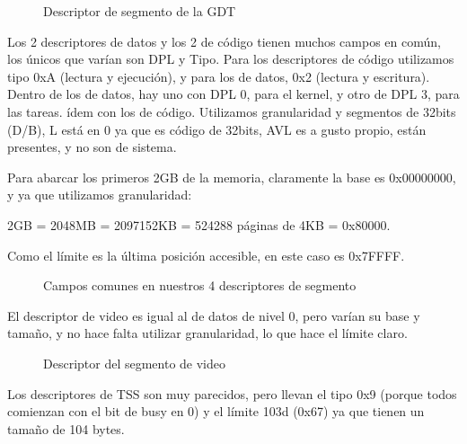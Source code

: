 \documentclass[10pt, a4paper]{article}
\begin{document}
		\begin{figure}[H]
	  		\centering
			\caption{Descriptor de segmento de la GDT}
			\label{fig:descriptorGDT}
		\end{figure}

Los 2 descriptores de datos y los 2 de código tienen muchos campos en común, los únicos que varían son DPL y Tipo. Para los descriptores de código utilizamos tipo 0xA (lectura y ejecución), y para los de datos, 0x2 (lectura y escritura). Dentro de los de datos, hay uno con DPL 0, para el kernel, y otro de DPL 3, para las tareas. ídem con los de código.
Utilizamos granularidad y segmentos de 32bits (D/B), L está en 0 ya que es código de 32bits, AVL es a gusto propio, están presentes, y no son de sistema.

Para abarcar los primeros 2GB de la memoria, claramente la base es 0x00000000, y ya que utilizamos granularidad:

\begin{center}
2GB = 2048MB = 2097152KB = 524288 páginas de 4KB = 0x80000.
\end{center}

Como el l­ímite es la última posición accesible, en este caso es 0x7FFFF.
		\begin{figure}[H]
	  		\centering
			\caption{Campos comunes en nuestros 4 descriptores de segmento}
			\label{fig:descriptorGDTCamposComunes}
		\end{figure}
		
El descriptor de video es igual al de datos de nivel 0, pero varían su base y tamaño, y no hace falta utilizar granularidad, lo que hace el límite claro.
		\begin{figure}[H]
	  		\centering
			\caption{Descriptor del segmento de video}
			\label{fig:descriptorVideo}
		\end{figure}
		
Los descriptores de TSS son muy parecidos, pero llevan el tipo 0x9 (porque todos comienzan con el bit de busy en 0) y el límite 103d (0x67)  ya que tienen un tamaño de 104 bytes.
		
\end{document}
